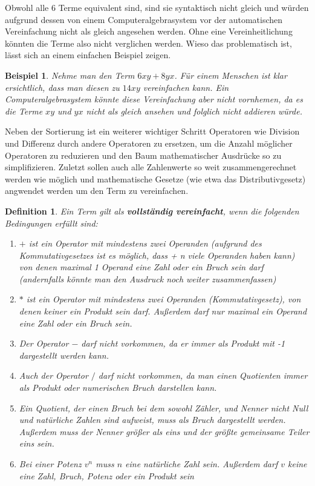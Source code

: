 \documentclass[11pt]{article}
\newtheorem{defin}{Definition}
\newtheorem{example}{Beispiel}
\begin{document}
Obwohl alle 6 Terme equivalent sind, sind sie syntaktisch nicht gleich und würden aufgrund dessen von einem Computeralgebrasystem
vor der automatischen Vereinfachung nicht als gleich angesehen werden. Ohne eine Vereinheitlichung könnten die Terme also nicht 
verglichen werden.
Wieso das problematisch ist, lässt sich an einem einfachen Beispiel zeigen.

\begin{example}
  Nehme man den Term $6xy+8yx$. Für einem Menschen ist klar ersichtlich, dass man diesen zu $14xy$ vereinfachen kann.
  Ein Computeralgebrasystem könnte diese Vereinfachung aber nicht vornhemen, da es die Terme $xy$ und $yx$ nicht als gleich
  ansehen und folglich nicht addieren würde.
\end{example}

Neben der Sortierung ist ein weiterer wichtiger Schritt Operatoren wie Division und Differenz durch andere Operatoren
zu ersetzen, um die Anzahl möglicher Operatoren zu reduzieren und den Baum mathematischer Ausdrücke so zu simplifizieren. \newline
Zuletzt sollen auch alle Zahlenwerte so weit zusammengerechnet werden wie möglich und mathematische Gesetze 
(wie etwa das Distributivgesetz) angwendet werden um den Term zu vereinfachen.

\begin{defin}
  Ein Term gilt als \textbf{vollständig vereinfacht}, wenn die folgenden Bedingungen erfüllt sind:
  \begin{enumerate}
    \item $+$ ist ein Operator mit mindestens zwei Operanden (aufgrund des Kommutativgesetzes ist es möglich, 
          dass + n viele Operanden haben kann) von denen maximal 1 Operand eine Zahl oder ein Bruch sein darf 
          (andernfalls könnte man den Ausdruck noch weiter zusammenfassen)
    \item $*$ ist ein Operator mit mindestens zwei Operanden (Kommutativgesetz), von denen keiner ein Produkt sein darf. 
          Außerdem darf nur maximal ein Operand eine Zahl oder ein Bruch sein. 
    \item Der Operator $-$ darf nicht vorkommen, da er immer als Produkt mit -1 dargestellt werden kann.
    \item Auch der Operator $/$ darf nicht vorkommen, da man einen Quotienten immer als Produkt oder numerischen Bruch darstellen kann.
    \item Ein Quotient, der einen Bruch bei dem sowohl Zähler, und Nenner nicht Null und natürliche Zahlen sind aufweist, 
          muss als Bruch dargestellt werden. Außerdem muss der Nenner größer als eins und der größte gemeinsame Teiler eins sein.
    \item Bei einer Potenz $v^n$ muss $n$ eine natürliche Zahl sein. Außerdem darf $v$ keine eine Zahl, Bruch, Potenz oder ein Produkt sein
  \end{enumerate}
\end{defin}
\end{document}

